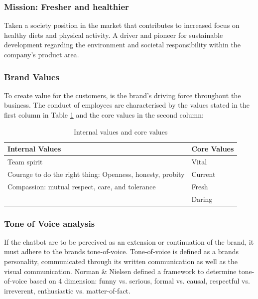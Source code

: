 \vspace{2,5mm}
  
        \subsubsection{Mission: Fresher and healthier}
        Taken a society position in the  market that contributes to increased focus on healthy diets and physical activity. A driver and pioneer for sustainable development regarding the environment and societal responsibility within the company’s product area.
        
\vspace{2,5mm}

        \subsubsection{Brand Values}
        
        To create value for the customers, is the brand's driving force throughout the business. The conduct of employees are characterised by the values stated in the first column in Table \ref{table:1} and the core values in the second column:
        
    \begin{table}[h]
    \begin{tabular}{ |p{9cm}||p{}|  }
     \hline
     Internal Values & Core Values \\
     \hline
        Team spirit & Vital \\
        Courage to do the right thing: Openness, honesty, probity & Current\\
        Compassion: mutual respect, care, and tolerance & Fresh \\
        & Daring    \\
     \hline
    \end{tabular}
    \caption{Internal values and core values}
    \label{table:1}
    \end{table}

        \subsubsection{Tone of Voice analysis}
    
        If the chatbot are to be perceived as an extension or continuation of the brand, it must adhere to the brands tone-of-voice. Tone-of-voice is defined as a brands personality, communicated through its written communication as well as the visual communication. Norman \& Nielsen defined a framework to determine tone-of-voice based on 4 dimension: funny vs. serious, formal vs. causal, respectful vs. irreverent, enthusiastic vs. matter-of-fact.
    
